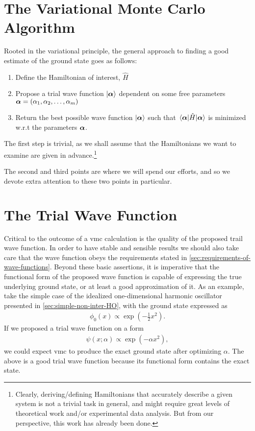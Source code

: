\documentclass[Thesis.tex]{subfiles}
\begin{document}
\section{The Variational Monte Carlo Algorithm}

Rooted in the variational principle, the general approach to finding a good estimate of
the ground state goes as follows:

\begin{enumerate}
    \item Define the Hamiltonian of interest, $\hat H$
    \item Propose a trial wave function $| \bm{\alpha} \rangle$ dependent on some free parameters
        $\bm{\alpha}=\qty(\alpha_1, \alpha_2,\dots, \alpha_m)$
    \item Return the best possible wave function $| \bm{\alpha} \rangle$ such that $\expval{\hat
        H}{\bm{\alpha}}$ is minimized w.r.t the parameters $\bm{\alpha}$.
\end{enumerate}
The first step is trivial, as we shall assume that the Hamiltonians we want to examine are
given in advance.\footnote{Clearly, deriving/defining Hamiltonians that accurately describe a given
system is not a trivial task in general, and might require great levels of theoretical
work and/or experimental data analysis. But from our perspective, this work has already
been done.}

The second and third points are where we will spend our efforts, and so we devote extra
attention to these two points in particular.


\section{The Trial Wave Function}

Critical to the outcome of a \gls{vmc} calculation is the quality of the proposed trail wave
function. In order to have stable and sensible results we should also take care that the
wave function obeys the requirements stated in
\cref{sec:requirements-of-wave-functions}. Beyond these basic assertions, it is
imperative that the functional form of the proposed wave function is capable of expressing
the true underlying ground state, or at least a good approximation of it. As an example,
take the simple case of the idealized one-dimensional harmonic oscillator presented in
\cref{sec:simple-non-inter-HO}, with the ground state expressed as
\begin{align}
    \phi_0(x) \propto \exp(- \frac{1}{2} x^2).
\end{align}
If we proposed a trial wave function on a form
\begin{align}
    \psi(x; \alpha)\propto \exp(- \alpha x^2),
\end{align}
we could expect \gls{vmc} to produce the exact ground state after optimizing $\alpha$. The above
is a good trial wave function because its functional form contains the exact state.
\end{document}
